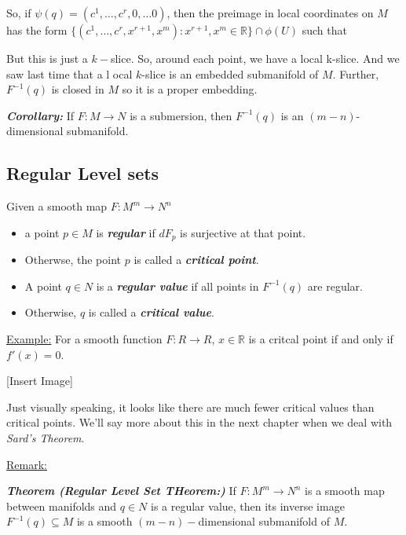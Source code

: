 \documentclass{article}
\newcommand{\R}{\mathbb{R}}
\begin{document}
So, if $\psi(q) = (c^1, \dots, c^r, 0, \dots 0)$, then the preimage in local coordinates on $M$ has the form $\{(c^1, \dots, c^r, x^{r+1}, x^{m}) :  x^{r+1}, x^{m} \in \R \} \cap \phi(U)$ such that 

But this is just a $k-$slice. So, around each point, we have a local k-slice. And we saw last time that a l ocal $k$-slice is an embedded submanifold of $M$. Further, $F^{-1}(q)$ is closed in $M$ so it is a proper embedding.

\vskip 0.5cm
\begin{dottedbox}
  \emph{\textbf{Corollary:}} If $F: M \rightarrow N$ is a submersion, then $F^{-1}(q)$ is an $(m-n)$-dimensional submanifold.
\end{dottedbox}

\vskip 0.5cm
\subsection*{Regular Level sets}

\begin{mathdefinitionbox}{}
  Given a smooth map $F : M^m \rightarrow N^n$
  \begin{itemize}
    \item a point $p \in M$ is \emph{\textbf{regular}} if $dF_p$ is surjective at that point.
    \item Otherwse, the point $p$ is called a \emph{\textbf{critical point}}.
    \item A point $q \in N$ is a \emph{\textbf{regular value}} if all points in $F^{-1}(q)$ are regular.
    \item Otherwise, $q$ is called a \emph{\textbf{critical value}}.
  \end{itemize}
\end{mathdefinitionbox}

\vskip 0.5cm
\underline{Example:} For a smooth function $F : R \rightarrow R$, $x \in \R$ is a critcal point if and only if $f'(x) = 0$.

\vskip 0.5cm
[Insert Image]

\vskip 0.5cm
Just visually speaking, it looks like there are much fewer critical values than critical points. We'll say more about this in the next chapter when we deal with \emph{Sard's Theorem}.

\vskip 0.5cm
\begin{dottedbox}
  \underline{Remark:} 
\end{dottedbox}

\vskip 0.5cm
\begin{dottedbox}
  \emph{\textbf{Theorem (Regular Level Set THeorem:)}} If $F : M^m \rightarrow N^n$ is a smooth map between manifolds and $q \in N$ is a regular value, then its inverse image $F^{-1}(q) \subseteq M$ is a smooth $(m-n)-$dimensional submanifold of $M$.
\end{dottedbox}
\end{document}
